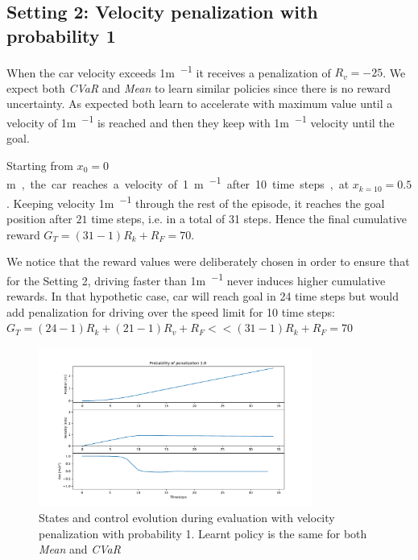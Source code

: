 \subsection{Setting 2: Velocity penalization with probability 1 }
When the car velocity exceeds 1\si{\metre\per\ts} it receives a penalization of $R_v=-25$.
We expect both \textit{CVaR} and \textit{Mean} to learn similar policies 
since there is no reward uncertainty. As expected
both learn to accelerate with maximum value
until a velocity of 1\si{\metre\per\ts} is reached
and then they keep with 1\si{\metre\per\ts} velocity until the goal.

Starting from $x_0=0$\si\metre, the car reaches a velocity of 1\si{\metre\per\ts} after 
10 time steps, at $x_{k=10}=0.5$. Keeping velocity 1\si{\metre\per\ts} through 
the rest of the episode, it reaches the goal position after $21$ time steps, i.e. in a total of 31 steps.
Hence the final cumulative reward $G_T= (31-1) R_{k} + R_{F}=70$.

We notice that the reward values were deliberately chosen in order to ensure that for the Setting 2,
driving faster than 1\si{\metre\per\ts} never induces higher cumulative
rewards. In that hypothetic case, car will reach goal in 24 time steps
but would add penalization for driving over the speed limit for 10 time steps:\\
$G_T= (24-1)R_{k} + (21-1)R_{v} + R_{F} << (31-1) R_{k} + R_{F}=70$

\begin{figure}[ht]
        \centering
        \includegraphics[width=0.8\textwidth]{images/Car/CVAR/Trajectory_penal.pdf}
        \caption{States and control evolution during evaluation with velocity penalization
        with probability 1.
        Learnt policy is the same for both \textit{Mean} and \textit{CVaR}}
        \label{fig:traj1_penal1}
    
\end{figure}

